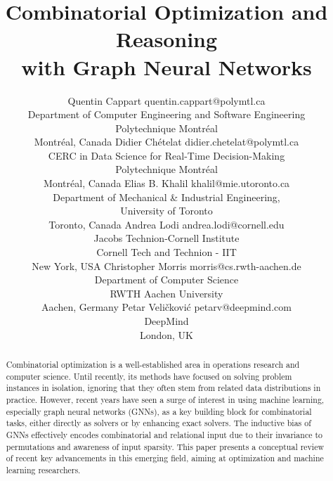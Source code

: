 \documentclass[twoside,11pt]{article}
\begin{document}
\title{Combinatorial Optimization and Reasoning\\ with Graph Neural Networks}

\author{\name Quentin Cappart  \email quentin.cappart@polymtl.ca \\
       \addr Department of Computer Engineering and Software Engineering\\
       Polytechnique Montr{\'e}al\\
       Montr{\'e}al, Canada
       \AND
       \name Didier Chételat  \email didier.chetelat@polymtl.ca \\
       \addr CERC in Data Science for Real-Time Decision-Making\\
       Polytechnique Montr{\'e}al\\
       Montr{\'e}al, Canada
       \AND
       \name Elias B. Khalil \email khalil@mie.utoronto.ca\\
       \addr Department of Mechanical \& Industrial Engineering,\\
       University of Toronto\\
       Toronto, Canada
       \AND
       \name Andrea Lodi  \email andrea.lodi@cornell.edu \\
       \addr Jacobs Technion-Cornell Institute\\
       Cornell Tech and Technion - IIT\\
       New York, USA
        \AND
       \name  Christopher Morris  \email morris@cs.rwth-aachen.de \\
       \addr Department of Computer Science\\
       RWTH Aachen University\\
       Aachen, Germany
      \AND
       \name Petar Veli\v{c}kovi\'{c} \email petarv@deepmind.com\\
       \addr DeepMind\\
       London, UK
     }


\maketitle

\begin{abstract}%
Combinatorial optimization is a well-established area in operations research and computer science. Until recently, its methods have focused on solving problem instances in isolation, ignoring that they often stem from related data distributions in practice. However, recent years have seen a surge of interest in using machine learning, especially graph neural networks (GNNs), as a key building block for combinatorial tasks, either directly as solvers or by enhancing exact solvers. The inductive bias of GNNs effectively encodes combinatorial and relational input due to their invariance to permutations and awareness of input sparsity. This paper presents a conceptual review of recent key advancements in this emerging field, aiming at optimization and machine learning researchers.
\end{abstract}
\end{document}
